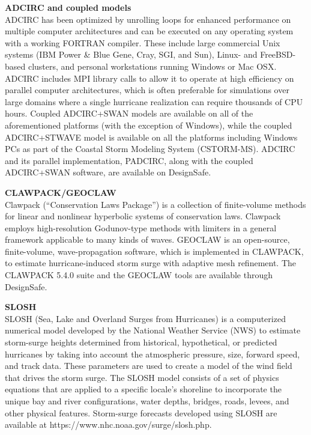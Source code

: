 \noindent\textbf{ADCIRC and coupled models} \\ADCIRC has been optimized by unrolling loops for enhanced performance on multiple computer architectures and can be executed on any operating system with a working FORTRAN compiler. These include large commercial Unix systems (IBM Power \& Blue Gene, Cray, SGI, and Sun), Linux- and FreeBSD-based clusters, and personal workstations running Windows or Mac OSX. ADCIRC includes MPI library calls to allow it to operate at high efficiency on parallel computer architectures, which is often preferable for simulations over large domains where a single hurricane realization can require thousands of CPU hours. Coupled ADCIRC+SWAN models are available on all of the aforementioned platforms (with the exception of Windows), while the coupled ADCIRC+STWAVE model is available on all the platforms including Windows PCs as part of the Coastal Storm Modeling System (CSTORM-MS). ADCIRC and its parallel implementation, PADCIRC, along with the coupled ADCIRC+SWAN software, are available on DesignSafe.
\newline

\noindent\textbf{CLAWPACK/GEOCLAW} \\Clawpack (``Conservation Laws Package'') is a collection of finite-volume methods for linear and nonlinear hyperbolic systems of conservation laws. Clawpack employs high-resolution Godunov-type methods with limiters in a general framework applicable to many kinds of waves. GEOCLAW is an open-source, finite-volume, wave-propagation software, which is implemented in CLAWPACK, to estimate hurricane-induced storm surge with adaptive mesh refinement. The CLAWPACK 5.4.0 suite and the GEOCLAW tools are available through DesignSafe.
\newline

\noindent\textbf{SLOSH} \\SLOSH (Sea, Lake and Overland Surges from Hurricanes) is a computerized numerical model developed by the National Weather Service (NWS) to estimate storm-surge heights determined from historical, hypothetical, or predicted hurricanes by taking into account the atmospheric pressure, size, forward speed, and track data. These parameters are used to create a model of the wind field that drives the storm surge. The SLOSH model consists of a set of physics equations that are applied to a specific locale's shoreline to incorporate the unique bay and river configurations, water depths, bridges, roads, levees, and other physical features. Storm-surge forecasts developed using SLOSH are available at https://www.nhc.noaa.gov/surge/slosh.php.

